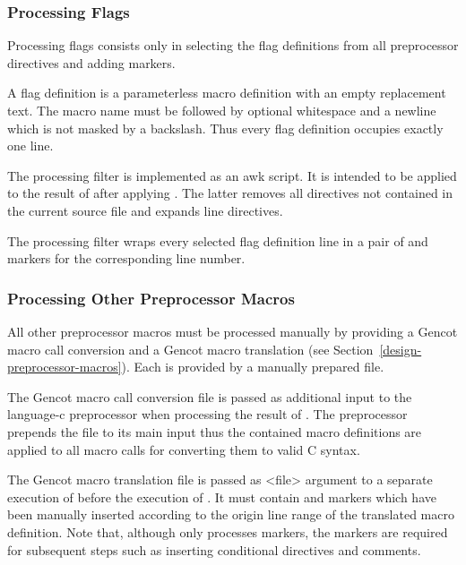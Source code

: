 \subsubsection{Processing Flags}

Processing flags consists only in selecting the flag definitions from all preprocessor directives and adding
 markers.

A flag definition is a parameterless macro definition with an empty replacement text. The macro name must 
be followed by optional whitespace and a newline which is not masked by a backslash. Thus every flag definition
occupies exactly one line.

The processing filter  is implemented as an awk script. It is intended to be applied 
to the result
of  after applying . The latter removes all directives not contained
in the current source file and expands line directives. 

The processing filter wraps every selected flag definition line in a pair of  and  
markers for the corresponding line number.

\subsubsection{Processing Other Preprocessor Macros}

All other preprocessor macros must be processed manually by providing a Gencot macro call conversion and a
Gencot macro translation (see Section~\ref{design-preprocessor-macros}). Each is provided by a manually
prepared file.

The Gencot macro call conversion file is passed as additional input to the language-c preprocessor when
processing the result of . The preprocessor prepends the file to its main input thus 
the contained macro definitions are applied to all macro calls for converting them to valid C syntax.

The Gencot macro translation file is passed as <file> argument to a separate execution of 
before the execution of . It must contain  and 
markers which have been manually inserted according to the origin line range of the translated macro
definition. Note that, although  only processes  markers, the 
markers are required for subsequent steps such as inserting conditional directives and comments.


